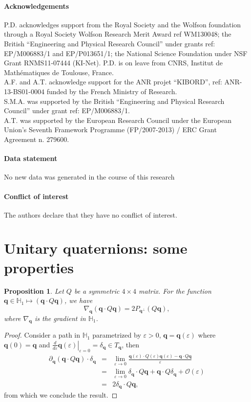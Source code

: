 \documentclass[12pt]{article}
\def\to{\rightarrow}
\def\eps{\varepsilon}
\newtheorem{proposition}[theorem]{Proposition}
\newcommand{\beqar}{\begin{eqnarray*}}
\newcommand{\eeqar}{\end{eqnarray*}}
\newcommand{\be}{\begin{equation}}
\newcommand{\ee}{\end{equation}}
\newcommand{\unitq}{{\mathbb{H}_1}}
\newcommand{\q}{\mathbf{q}}
\begin{document}
\paragraph{Acknowledgements} 

P.D. acknowledges support from the Royal Society and the Wolfson foundation through a Royal Society Wolfson Research Merit Award ref WM130048; the British “Engineering and Physical Research Council” under grants ref: EP/M006883/1 and EP/P013651/1; the National Science Foundation under NSF Grant RNMS11-07444 (KI-Net). P.D. is on leave from CNRS, Institut de Math\'ematiques de Toulouse, France.\\
A.F. and A.T. acknowledge support for the ANR projet “KIBORD”, ref: ANR-13-BS01-0004 funded by the French Ministry of Research.\\
S.M.A. was supported by the British “Engineering and Physical Research Council” under grant ref: EP/M006883/1.\\
A.T. was supported by the European Research Council under the European Union's Seventh Framework Programme (FP/2007-2013) / ERC Grant Agreement n. 279600.


\paragraph{Data statement}

No new data was generated in the course of this research


\paragraph{Conflict of interest} The authors declare that they have no conflict of interest. 


\appendix

\section{Unitary quaternions: some properties}

\begin{proposition} 
\label{prop:} Let $Q$ be a symmetric $4\times4$ matrix. For the function $\q\in\unitq \mapsto (\q\cdot Q\q)$, we have
\be 
\label{eq:gradient Q}
\nabla_\q(\q\cdot Q\q)= 2P_{\q^\perp}(Q\q), 
\ee
where $\nabla_\q$ is the gradient in $\unitq$.
\end{proposition}
\begin{proof}
Consider a path in $\unitq$ parametrized by $\eps>0$, $\q=\q(\eps)$ where $\q(0)=\q$ and $\left.\frac{d}{d\eps}\q(\eps)\right|_{\eps=0}=\delta_\q\in T_\q$, then
\beqar
\partial_\q(\q\cdot Q\q) \cdot \delta_\q &=& \lim_{\eps\to 0}\frac{\q(\eps)\cdot Q(\eps)\q(\eps)-\q\cdot Q\q}{\eps}\\
&=& \lim_{\eps \to 0}\delta_{ \q} \cdot Q\q + \q\cdot Q\delta_{ \q} + \mathcal{O}(\eps)\\
&=& 2 \delta_{\q}\cdot Q\q,
\eeqar
from which we conclude the result.
\end{proof}
\end{document}
